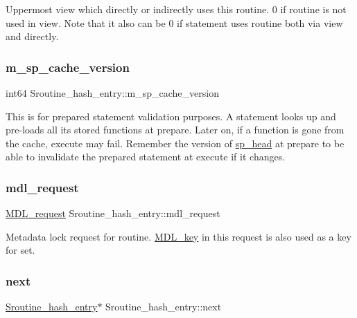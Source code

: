 Uppermost view which directly or indirectly uses this routine. 0 if routine is not used in view. Note that it also can be 0 if statement uses routine both via view and directly. \mbox{\label{classSroutine__hash__entry_aeade37d74fafe8a860b1c6e37c45df97}} 
\subsubsection{\texorpdfstring{m\+\_\+sp\+\_\+cache\+\_\+version}{m\_sp\_cache\_version}}
{\footnotesize\ttfamily int64 Sroutine\+\_\+hash\+\_\+entry\+::m\+\_\+sp\+\_\+cache\+\_\+version}

This is for prepared statement validation purposes. A statement looks up and pre-\/loads all its stored functions at prepare. Later on, if a function is gone from the cache, execute may fail. Remember the version of \mbox{\hyperlink{classsp__head}{sp\+\_\+head}} at prepare to be able to invalidate the prepared statement at execute if it changes. \mbox{\label{classSroutine__hash__entry_a5ad1ee11879a690fc6a3c7370cdd336b}} 
\subsubsection{\texorpdfstring{mdl\+\_\+request}{mdl\_request}}
{\footnotesize\ttfamily \mbox{\hyperlink{classMDL__request}{M\+D\+L\+\_\+request}} Sroutine\+\_\+hash\+\_\+entry\+::mdl\+\_\+request}

Metadata lock request for routine. \mbox{\hyperlink{structMDL__key}{M\+D\+L\+\_\+key}} in this request is also used as a key for set. \mbox{\label{classSroutine__hash__entry_a5a3994c4b9f777644d75cbdd994dda92}} 
\subsubsection{\texorpdfstring{next}{next}}
{\footnotesize\ttfamily \mbox{\hyperlink{classSroutine__hash__entry}{Sroutine\+\_\+hash\+\_\+entry}}$\ast$ Sroutine\+\_\+hash\+\_\+entry\+::next}

